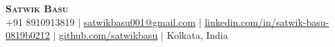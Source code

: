 \documentclass[letterpaper,11pt]{article}
\begin{document}
\begin{center}
    \textbf{\Huge \scshape Satwik Basu} \\ \vspace{1pt}
    \footnotesize +91 8910913819 $|$ \href{mailto:satwikbasu001@gmail.com}{\underline{satwikbasu001@gmail.com}} $|$
    \href{https://www.linkedin.com/in/satwik-basu-0819b0212}{\underline{linkedin.com/in/satwik-basu-0819b0212}} $|$
    \href{https://github.com/satwikbasu}{\underline{github.com/satwikbasu}} $|$
    Kolkata, India
\end{center}







\end{document}
